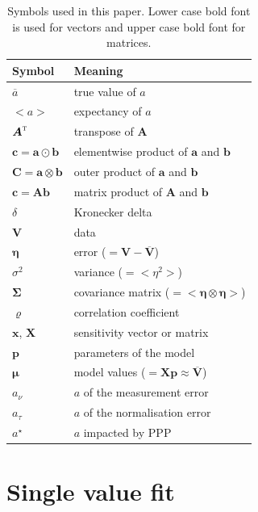 \documentclass[a4paper,fleqn,usenatbib]{mnras}
\def\vec#1{\ensuremath{\boldsymbol{#1}}}
\def\tr#1{\ensuremath{{#1}^\text{\textsc{t}}}}
\def\expect#1{\ensuremath{ {<#1>} }}
\def\ppp#1{#1^\star}
\def\norm{_\tau}
\def\meas{_\nu}
\def\mean#1{\overline{#1}}
\let\outer=\otimes
\let\hadam=\odot
\def\data{\ensuremath{{\scriptstyle V}}}
\def\vdata{\ensuremath{\vec\data}}
\def\vdatamean{\ensuremath{\mean\vdata}}
\def\vmod{\ensuremath{\vec\mu}}
\def\error{\ensuremath{\eta}}
\def\verror{\ensuremath{\vec\error}}
\def\dev{\ensuremath{\sigma}}
\def\cov{\ensuremath{\Sigma}}
\def\vcov{\ensuremath{\vec\cov}}
\def\corr{\ensuremath{\varrho}}
\def\sens{\ensuremath{x}}
\def\vsens{\ensuremath{\vec\sens}}
\def\msens{\ensuremath{\vec X}}
\def\param{\ensuremath{p}}
\def\vparam{\ensuremath{\vec\param}}
\begin{document}
\begin{table}
\caption{Symbols used in this paper. Lower case bold font is used for vectors and upper case bold font for matrices.}
\begin{tabular}{ll}
\hline\hline
Symbol                        & Meaning\\
\hline
$\mean a$                     & true value of $a$\\
$<a>$                         & expectancy of $a$\\
$\tr{\vec A}$                 & transpose of $\vec A$\\
$\vec c = \vec a\hadam\vec b$ & elementwise product of $\vec a$ and $\vec b$\\
$\vec C = \vec a\outer\vec b$ & outer product of $\vec a$ and $\vec b$\\
$\vec c = \vec A\vec b$       & matrix product of $\vec A$ and $\vec b$\\
$\delta$                      & Kronecker delta\\
\hline
$\vdata$                      & data\\ 
$\verror$                     & error ($= \vdata - \vdatamean$)\\
$\dev^2$                      & variance ($= \expect{\error^2}$)\\
$\vcov$                       & covariance matrix ($= \expect{\verror\outer\verror}$)\\
$\corr$                       & correlation coefficient\\
$\vsens$, $\msens$            & sensitivity vector or matrix\\
$\vparam$                     & parameters of the model\\
$\vmod$                       & model values ($= \msens\vparam\approx\vdatamean$)\\
\hline
$a\meas$                      & $a$ of the measurement error\\
$a\norm$                      & $a$ of the normalisation error\\
$\ppp a$                      & $a$ impacted by PPP\\
\hline
\end{tabular}
\end{table}

\section{Single value fit}
\label{sec:single} 
\end{document}
